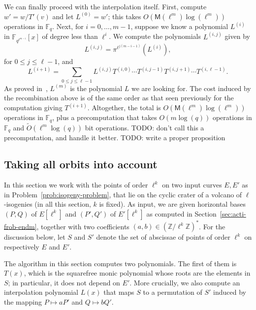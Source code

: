 \documentclass{lms}
\newcommand{\todo}[1]{{\color{red}TODO: #1}}
\newcommand{\F}{\mathbb{F}}
\begin{document}
We can finally proceed with the interpolation itself. First, compute
$w' = w/T'(v)$ and let $L^{(0)}=w'$; this takes $O(\mathsf{M}(\ell^m)\log(\ell^m))$ operations in $\F_q$.
Next, for $i=0,\dots,m-1$, suppose we
know a polynomial $L^{(i)}$ in $\F_{q^{\ell^{m-i}}}[x]$
 of degree less than
$\ell^i$. We compute the polynomials $L^{(i,j)}$ given by
$$L^{(i,j)}= \pi^{\ell^{j(m-i-1)}}\left (L^{(i)} \right),$$
for $0 \le j \le \ell-1$, 
and 
$$L^{(i+1)} = \sum_{0 \le j \le \ell-1} L^{(i,j)} T^{(i,0)} \cdots
T^{(i,j-1)} T^{(i,j+1)} \cdots T^{(i,\ell-1)}.$$ As proved
in~\cite{df10}, $L^{(m)}$ is the polynomial $L$ we are looking for.
The cost induced by the recombination above is of the same order as
that seen previously for the computation giving
$T^{(i+1)}$. Altogether, the total is $O(\mathsf{M}(\ell^m)
\log(\ell^m))$ operations in $\F_q$, plus a precomputation that takes
$O(m \log(q))$ operations in $\F_q$ and $\tilde{O}(\ell^{m} \log(q))$
bit operations. \todo{don't call this a precomputation, and handle it better.}
\todo{write a proper proposition}

\subsection{Taking all orbits into account}

In this section we work with the points of order $\ell^k$ on two input
curves $E,E'$ as in Problem~\ref{prob:isogeny-problem}, that lie on
the cyclic crater of a volcano of $\ell$-isogenies (in all this
section, $k$ is fixed).
As input, we are given horizontal bases $(P,Q)$ of $E[\ell^k]$ and
$(P',Q')$ of $E'[\ell^k]$ as computed in
Section~\ref{sec:acti-frob-endm}, together with two coefficients $(a,b)
\in \left(\mathbb{Z}/\ell^k \mathbb{Z} \right)^*$. For the discussion below,
let $S$ and $S'$ denote the set of abscissae of points of order
$\ell^k$ on respectively $E$ and $E'$.

The algorithm in this section computes two polynomials. The first of
them is $T(x)$, which is the squarefree monic polynomial whose roots
are the elements in $S$; in particular, it does not depend on
$E'$. More crucially, we also compute an interpolation polynomial
$L(x)$ that maps $S$ to a permutation of $S'$ induced by the mapping
$P \mapsto aP'$ and $Q \mapsto bQ'$.
\end{document}
